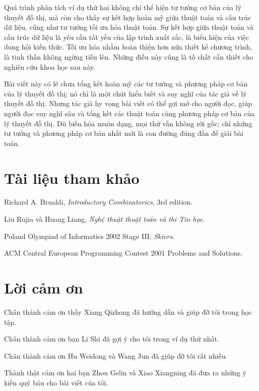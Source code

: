 \documentclass[11pt]{article}
\begin{document}
Quá trình phân tích ví dụ thứ hai không chỉ thể hiện tư tưởng cơ bản của lý
thuyết đồ thị, mà còn cho thấy sự kết hợp hoàn mỹ giữa thuật toán và cấu trúc
dữ liệu, cũng như tư tưởng tối ưu hóa thuật toán. Sự kết hợp giữa thuật toán
và cấu trúc dữ liệu là yêu cầu tất yếu của lập trình xuất sắc, là biểu hiện
của việc dung hội kiến thức. Tối ưu hóa nhằm hoàn thiện hơn nữa thiết kế
chương trình, là tinh thần không ngừng tiến lên. Những điều này cũng là tố
chất cần thiết cho nghiên cứu khoa học sau này.

Bài viết này có lẽ chưa tổng kết hoàn mỹ các tư tưởng và phương pháp cơ bản
của lý thuyết đồ thị; nó chỉ là một chút hiểu biết và suy nghĩ của tác giả về
lý thuyết đồ thị. Nhưng tác giả hy vọng bài viết có thể gợi mở cho người đọc,
giúp người đọc suy nghĩ sâu và tổng kết các thuật toán cùng phương pháp cơ bản
của lý thuyết đồ thị. Dù biến hóa muôn dạng, mọi thứ vẫn không rời gốc; chỉ
những tư tưởng và phương pháp cơ bản nhất mới là con đường đúng đắn để giải
bài toán.

\section*{Tài liệu tham khảo}
\begin{enumerate}[label={[\arabic*]}]
  \item Richard A. Brualdi, \emph{Introductory Combinatorics}, 3rd edition.
  \item Liu Rujia và Huang Liang, \emph{Nghệ thuật thuật toán và thi Tin học}.
  \item Poland Olympiad of Informatics 2002 Stage III: \emph{Skiers}.
  \item ACM Central European Programming Contest 2001 Problems and Solutions.
\end{enumerate}

\section*{Lời cảm ơn}

Chân thành cảm ơn thầy Xiang Qizhong đã hướng dẫn và giúp đỡ tôi trong học
tập.

Chân thành cảm ơn bạn Li Shi đã gợi ý cho tôi trong ví dụ thứ nhất.

Chân thành cảm ơn Hu Weidong và Wang Jun đã giúp đỡ tôi rất nhiều.

Thành thật cảm ơn hai bạn Zhou Gelin và Xiao Xiangning đã đưa ra những ý kiến
quý báu cho bài viết của tôi.

\appendix
\end{document}
